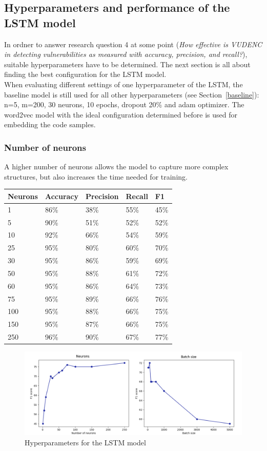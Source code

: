 \documentclass[
a4paper,
pagesize,
pdftex,
12pt,
twoside, %
BCOR=5mm, %
ngerman,
fleqn,
final,
]{scrartcl}
\begin{document}
	\subsection{Hyperparameters and performance of the LSTM model}
	
	In ordner to answer research question 4 at some point (\textit{How effective is VUDENC in detecting vulnerabilities as measured with accuracy, precision, and recall?}), suitable hyperparameters have to be determined. The next section is all about finding the best configuration for the LSTM model. \\	
	When evaluating different settings of one hyperparameter of the LSTM, the baseline model is still used for all other hyperparameters (see Section~\ref{baseline}): n=5, m=200, 30 neurons, 10 epochs, dropout 20\% and adam optimizer. The word2vec model with the ideal configuration determined before is used for embedding the code samples.

	\subsubsection{Number of neurons}
	A higher number of neurons allows the model to capture more complex structures, but also increases the time needed for training.
	
	\begin{tabular}{ | p{2cm} || p{2cm}|p{2cm}|p{2cm}|p{2cm}|  }
		\hline
		Neurons & Accuracy & Precision & Recall & F1 \\
		\hline
		1 & 86\% & 38\% & 55\% & 45\% \\
		5 & 90\% &  51\% &  52\% &  52\% \\
		10 & 92\% &  66\% &  54\% &  59\% \\
		25 & 95\% &  80\% &  60\% &  70\% \\
		30 & 95\% &  86\% &  59\% &  69\% \\
		50 & 95\% &  88\% &  61\% &  72\% \\
		60 & 95\% &  86\% &  64\% &  73\%\\
		75 & 95\% &  89\% &  66\% &  76\% \\
		100 & 95\% &  88\% &  66\% &  75\% \\
		150 & 95\% &  87\% &  66\% &  75\% \\
		250 & 96\% &  90\% &  67\% &  77\% \\
		\hline
		\hline

	\end{tabular}
			\begin{figure}[h]
		\centering
		\includegraphics[width=1\textwidth]{img/hyper1}
		\caption{Hyperparameters for the LSTM model}
		\label{fig:hyper1}
	\end{figure}
\end{document}
